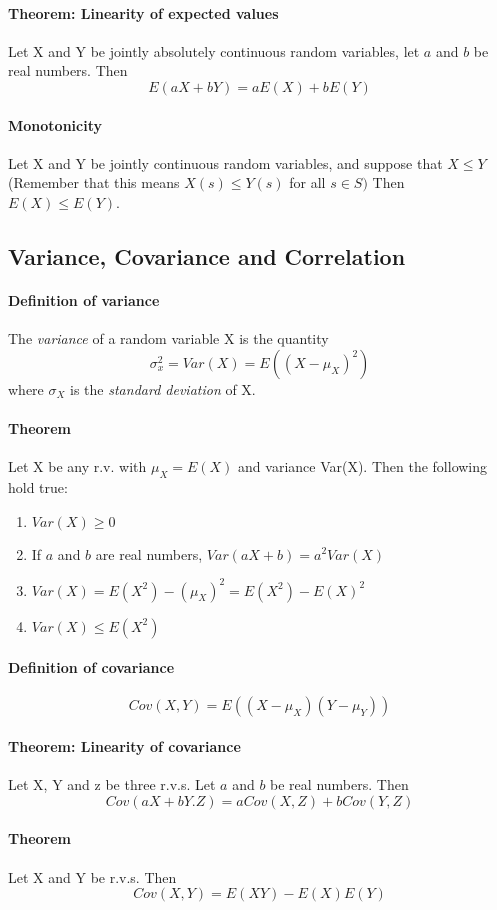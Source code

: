 \documentclass[11pt]{article}
\newcommand{\ti}[1]{\textit{#1}}
\begin{document}
 \paragraph{Theorem: Linearity of expected values} Let X and Y be jointly absolutely continuous random variables, let $a$ and $b$ be real numbers. Then $$E(aX + bY) = aE(X) + bE(Y)$$
\paragraph{Monotonicity} Let X and Y be jointly continuous random variables, and suppose that $X \leq Y$ (Remember that this means $X(s) \leq Y(s)$ for all $s\in S)$ Then $E(X) \leq E(Y)$.
\subsection{Variance, Covariance and Correlation}
\paragraph{Definition of variance} The \ti{variance} of a random variable X is the quantity
$$\sigma^2_x = Var(X) = E((X - \mu_X)^2)$$
where $\sigma_X$ is the \ti{standard deviation} of X.
\paragraph{Theorem} Let X be any r.v. with $\mu_X = E(X)$ and variance Var(X). Then the following hold true:
\begin{enumerate}
	\item $Var(X) \geq 0$
	\item If $a$ and $b$ are real numbers, $Var(aX+b) = a^2Var(X)$
	\item $Var(X) = E(X^2) - (\mu_X)^2 = E(X^2) - E(X)^2$
	\item $Var(X) \leq E(X^2)$
\end{enumerate}
\paragraph{Definition of covariance} $$Cov(X,Y) = E((X - \mu_X)(Y - \mu_Y))$$
\paragraph{Theorem: Linearity of covariance} Let X, Y and z be three r.v.s. Let $a$ and $b$ be real numbers. Then
$$Cov(aX + bY. Z) = aCov(X,Z) + bCov(Y,Z)$$
\paragraph{Theorem} Let X and Y be r.v.s. Then
$$Cov(X,Y) = E(XY) - E(X)E(Y)$$
\end{document}
